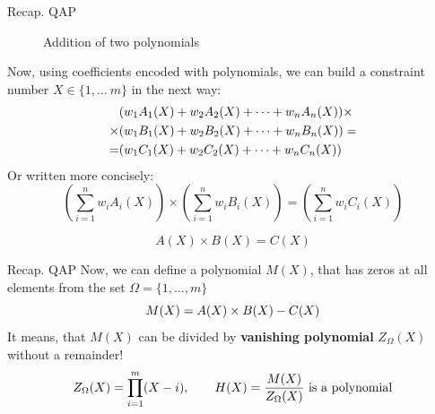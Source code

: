 \documentclass{zkdl-presentation-template}
\begin{document}
\begin{frame}{Recap. QAP}
\begin{figure}[H]
            \caption{Addition of two polynomials}
            \label{fig:example-polynomial-addition}
        \end{figure}
    \end{frame}

    \begin{frame}
        \vspace{-5pt}
        Now, using coefficients encoded with polynomials, we can build a constraint number 
        $X \in \{1, \dots\ m\}$ in the next way:
        \vspace{-5pt}
        \begin{align*}
            &(w_1A_1(X) + w_2A_2(X) + \dots + w_nA_n(X)) \times \\
            \times &(w_1B_1(X) + w_2B_2(X) + \dots + w_nB_n(X)) = \\ 
            = &(w_1C_1(X) + w_2C_2(X) + \dots + w_nC_n(X))
            \vspace{-5pt}
        \end{align*}
        \pause
        Or written more concisely:
        \vspace{-5pt}
        \begin{equation*}
            \left( \sum_{i = 1}^{n} w_iA_i(X) \right) \times \left( \sum_{i = 1}^{n} w_iB_i(X) \right) = \left( \sum_{i = 1}^{n} w_iC_i(X) \right)
        \end{equation*}   
        
        \vspace{-5pt}
        \begin{equation*}
            A(X) \times B(X) = C(X)
        \end{equation*}   
    \end{frame}

    \begin{frame}{Recap. QAP}
        Now, we can define a polynomial $M(X)$, that has zeros at all elements from the set
        $\Omega = \{1,\dots,m\}$
        \vspace{-5pt}
        \begin{equation*}
            M(X) = A(X) \times B(X) - C(X)
            \vspace{-5pt}
        \end{equation*}
        \pause
        It means, that $M(X)$ can be divided by \textbf{vanishing polynomial} $Z_{\Omega}(X)$ without a remainder!
        \vspace{-8pt}
        \begin{equation*}
            Z_{\Omega}(X) = \prod_{i=1}^m (X - i), \qquad \text{$H(X) = \frac{M(X)}{Z_{\Omega}(X)}$ is a polynomial}
            \vspace{-5pt}
        \end{equation*}
    \end{frame}
\end{document}
